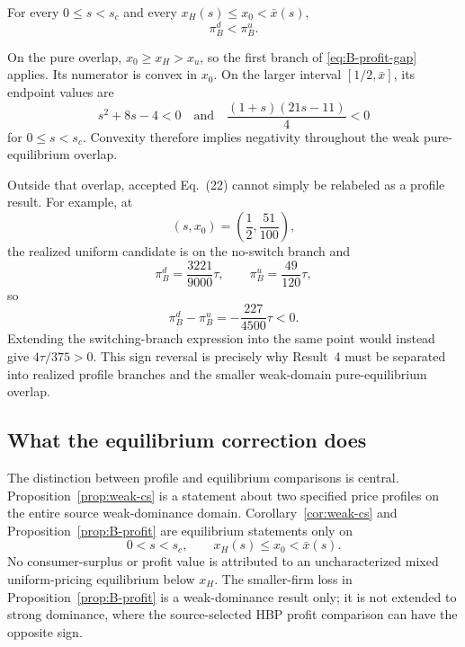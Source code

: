 \begin{proposition}
\label{prop:B-profit}
For every \(0\le s<s_c\) and every \(x_H(s)\le x_0<\bar x(s)\),
\[
\pi_B^d<\pi_B^u.
\]
\end{proposition}

On the pure overlap, \(x_0\ge x_H>x_u\), so the first branch of \eqref{eq:B-profit-gap} applies. Its numerator is convex in \(x_0\). On the larger interval \([1/2,\bar x]\), its endpoint values are
\[
s^2+8s-4<0
\quad\text{and}\quad
\frac{(1+s)(21s-11)}4<0
\]
for \(0\le s<s_c\). Convexity therefore implies negativity throughout the weak pure-equilibrium overlap.

Outside that overlap, accepted Eq.~(22) cannot simply be relabeled as a profile result. For example, at
\[
(s,x_0)=\left(\frac12,\frac{51}{100}\right),
\]
the realized uniform candidate is on the no-switch branch and
\[
\pi_B^d=\frac{3221}{9000}\tau,\qquad
\pi_B^u=\frac{49}{120}\tau,
\]
so
\[
\pi_B^d-\pi_B^u=-\frac{227}{4500}\tau<0.
\]
Extending the switching-branch expression into the same point would instead give \(4\tau/375>0\). This sign reversal is precisely why Result~4 must be separated into realized profile branches and the smaller weak-domain pure-equilibrium overlap.

\subsection{What the equilibrium correction does}

The distinction between profile and equilibrium comparisons is central. Proposition~\ref{prop:weak-cs} is a statement about two specified price profiles on the entire source weak-dominance domain. Corollary~\ref{cor:weak-cs} and Proposition~\ref{prop:B-profit} are equilibrium statements only on
\[
0<s<s_c,
\qquad
x_H(s)\le x_0<\bar x(s).
\]
No consumer-surplus or profit value is attributed to an uncharacterized mixed uniform-pricing equilibrium below \(x_H\). The smaller-firm loss in Proposition~\ref{prop:B-profit} is a weak-dominance result only; it is not extended to strong dominance, where the source-selected HBP profit comparison can have the opposite sign.
